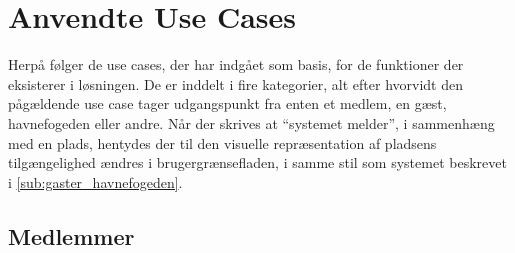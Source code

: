 \section{Anvendte Use Cases}

Herpå følger de use cases, der har indgået som basis, for de funktioner der eksisterer i løsningen. De er inddelt i fire kategorier, alt efter hvorvidt den pågældende use case tager udgangspunkt fra enten et medlem, en gæst, havnefogeden eller andre. Når der skrives at \enquote{systemet melder}, i sammenhæng med en plads, hentydes der til den visuelle repræsentation af pladsens tilgængelighed ændres i brugergrænsefladen, i samme stil som systemet beskrevet i \cref{sub:gaster_havnefogeden}.

\subsection{Medlemmer}  
